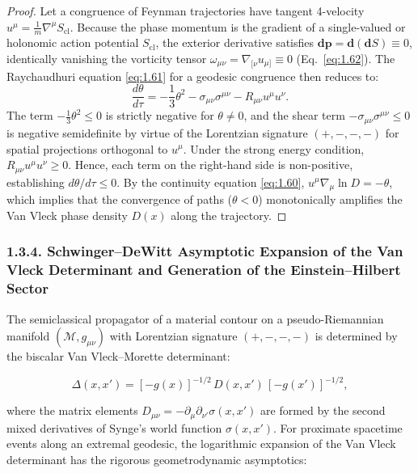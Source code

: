 \begin{proof}
Let a congruence of Feynman trajectories have tangent 4-velocity $u^\mu = \frac{1}{m} \nabla^\mu S_{\text{cl}}$. Because the phase momentum is the gradient of a single-valued or holonomic action potential $S_{\text{cl}}$, the exterior derivative satisfies $\mathbf{d}\mathbf{p} = \mathbf{d}(\mathbf{d}S) \equiv 0$, identically vanishing the vorticity tensor $\omega_{\mu\nu} = \nabla_{[\nu} u_{\mu]} \equiv 0$ (Eq.~\eqref{eq:1.62}). The Raychaudhuri equation \eqref{eq:1.61} for a geodesic congruence then reduces to:
\begin{equation*}
\frac{d\theta}{d\tau} = -\frac{1}{3}\theta^2 - \sigma_{\mu\nu}\sigma^{\mu\nu} - R_{\mu\nu} u^\mu u^\nu.
\end{equation*}
The term $-\frac{1}{3}\theta^2 \le 0$ is strictly negative for $\theta \ne 0$, and the shear term $-\sigma_{\mu\nu}\sigma^{\mu\nu} \le 0$ is negative semidefinite by virtue of the Lorentzian signature $(+,-,-,-)$ for spatial projections orthogonal to $u^\mu$. Under the strong energy condition, $R_{\mu\nu} u^\mu u^\nu \ge 0$. Hence, each term on the right-hand side is non-positive, establishing $d\theta/d\tau \le 0$. By the continuity equation \eqref{eq:1.60}, $u^\mu \nabla_\mu \ln D = -\theta$, which implies that the convergence of paths ($\theta < 0$) monotonically amplifies the Van Vleck phase density $D(x)$ along the trajectory.
\end{proof}


\subsubsection{1.3.4. Schwinger--DeWitt Asymptotic Expansion of the Van Vleck Determinant and Generation of the Einstein--Hilbert Sector}\label{sec:1.3.4}

The semiclassical propagator of a material contour on a pseudo-Riemannian manifold $(\mathcal{M}, g_{\mu\nu})$ with Lorentzian signature $(+,-,-,-)$ is determined by the biscalar Van Vleck--Morette determinant:

\begin{equation}\label{eq:1.63a}\tag{1.63a}
\Delta(x, x') = [-g(x)]^{-1/2} \, D(x, x') \, [-g(x')]^{-1/2},
\end{equation}

where the matrix elements $D_{\mu\nu} = -\partial_\mu \partial_{\nu'} \sigma(x, x')$ are formed by the second mixed derivatives of Synge's world function $\sigma(x, x')$. For proximate spacetime events along an extremal geodesic, the logarithmic expansion of the Van Vleck determinant has the rigorous geometrodynamic asymptotics:

